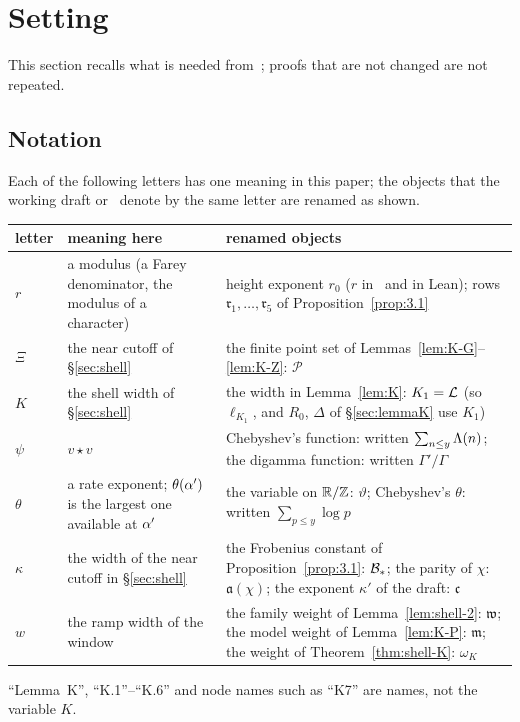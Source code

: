 \section{Setting}\label{sec:setting}
This section recalls what is needed from~\cite{DSouza}; proofs that are not changed are not repeated.

\subsection{Notation}\label{ssec:notation}
Each of the following letters has one meaning in this paper; the objects that the working draft or~\cite{DSouza} denote by the same letter are
renamed as shown.

\begin{center}\small
\begin{tabular}{@{}>{\raggedright\arraybackslash}p{1.1cm}>{\raggedright\arraybackslash}p{6.4cm}>{\raggedright\arraybackslash}p{7.0cm}@{}}
\toprule
letter & meaning here & renamed objects\\
\midrule
$r$ & a modulus (a Farey denominator, the modulus of a character) & height exponent $r_0$ ($r$ in~\cite{DSouza} and in Lean); rows $\mathfrak r_1,\dots,\mathfrak r_5$ of Proposition~\ref{prop:3.1}\\
$\Xi$ & the near cutoff of \S\ref{sec:shell} & the finite point set of Lemmas~\ref{lem:K-G}--\ref{lem:K-Z}: $\mathcal P$\\
$K$ & the shell width of \S\ref{sec:shell} & the width in Lemma~\ref{lem:K}: $K_1=\mathcal L$ (so $\ell_{K_1}$, and $R_0$, $\Delta$ of \S\ref{sec:lemmaK} use $K_1$)\\
$\psi$ & $v\star v$ & Chebyshev's function: written $\sum_{n\le y}\Lambda(n)$; the digamma function: written $\Gamma'/\Gamma$\\
$\theta$ & a rate exponent; $\theta(\alpha')$ is the largest one available at $\alpha'$ & the variable on $\mathbb R/\mathbb Z$: $\vartheta$; Chebyshev's $\theta$: written $\sum_{p\le y}\log p$\\
$\kappa$ & the width of the near cutoff in \S\ref{sec:shell} & the Frobenius constant of Proposition~\ref{prop:3.1}: $\mathcal B_*$; the parity of $\chi$: $\mathfrak a(\chi)$; the exponent $\kappa'$ of the draft: $\mathfrak c$\\
$w$ & the ramp width of the window & the family weight of Lemma~\ref{lem:shell-2}: $\mathfrak w$; the model weight of Lemma~\ref{lem:K-P}: $\mathfrak m$; the weight of Theorem~\ref{thm:shell-K}: $\omega_K$\\
\bottomrule
\end{tabular}
\end{center}
``Lemma~K'', ``K.1''--``K.6'' and node names such as ``K7'' are names, not the variable $K$.

